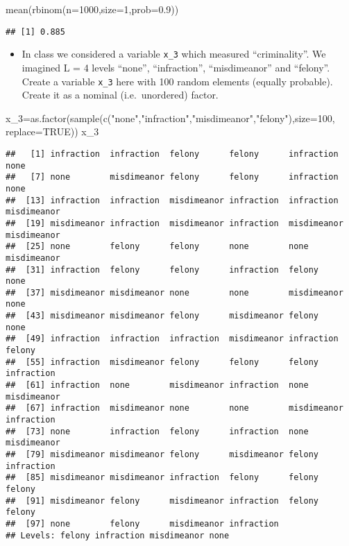 \documentclass[
]{article}
\newenvironment{Shaded}{\begin{snugshade}}{\end{snugshade}}
\newcommand{\AttributeTok}[1]{\textcolor[rgb]{0.77,0.63,0.00}{#1}}
\newcommand{\ConstantTok}[1]{\textcolor[rgb]{0.00,0.00,0.00}{#1}}
\newcommand{\DecValTok}[1]{\textcolor[rgb]{0.00,0.00,0.81}{#1}}
\newcommand{\FloatTok}[1]{\textcolor[rgb]{0.00,0.00,0.81}{#1}}
\newcommand{\FunctionTok}[1]{\textcolor[rgb]{0.00,0.00,0.00}{#1}}
\newcommand{\NormalTok}[1]{#1}
\newcommand{\OtherTok}[1]{\textcolor[rgb]{0.56,0.35,0.01}{#1}}
\newcommand{\StringTok}[1]{\textcolor[rgb]{0.31,0.60,0.02}{#1}}
\providecommand{\tightlist}{%
  \setlength{\itemsep}{0pt}\setlength{\parskip}{0pt}}
\begin{document}
\begin{Shaded}
\begin{Highlighting}[]
\FunctionTok{mean}\NormalTok{(}\FunctionTok{rbinom}\NormalTok{(}\AttributeTok{n=}\DecValTok{1000}\NormalTok{,}\AttributeTok{size=}\DecValTok{1}\NormalTok{,}\AttributeTok{prob=}\FloatTok{0.9}\NormalTok{))}
\end{Highlighting}
\end{Shaded}

\begin{verbatim}
## [1] 0.885
\end{verbatim}

\begin{itemize}
\tightlist
\item
  In class we considered a variable \texttt{x\_3} which measured
  ``criminality''. We imagined L = 4 levels ``none'', ``infraction'',
  ``misdimeanor'' and ``felony''. Create a variable \texttt{x\_3} here
  with 100 random elements (equally probable). Create it as a nominal
  (i.e.~unordered) factor.
\end{itemize}

\begin{Shaded}
\begin{Highlighting}[]
\NormalTok{x\_3}\OtherTok{=}\FunctionTok{as.factor}\NormalTok{(}\FunctionTok{sample}\NormalTok{(}\FunctionTok{c}\NormalTok{(}\StringTok{"none"}\NormalTok{,}\StringTok{"infraction"}\NormalTok{,}\StringTok{"misdimeanor"}\NormalTok{,}\StringTok{"felony"}\NormalTok{),}\AttributeTok{size=}\DecValTok{100}\NormalTok{, }\AttributeTok{replace=}\ConstantTok{TRUE}\NormalTok{))}
\NormalTok{x\_3}
\end{Highlighting}
\end{Shaded}

\begin{verbatim}
##   [1] infraction  infraction  felony      felony      infraction  none       
##   [7] none        misdimeanor felony      felony      infraction  none       
##  [13] infraction  infraction  misdimeanor infraction  infraction  misdimeanor
##  [19] misdimeanor infraction  misdimeanor infraction  misdimeanor misdimeanor
##  [25] none        felony      felony      none        none        misdimeanor
##  [31] infraction  felony      felony      infraction  felony      none       
##  [37] misdimeanor misdimeanor none        none        misdimeanor none       
##  [43] misdimeanor misdimeanor felony      misdimeanor felony      none       
##  [49] infraction  infraction  infraction  misdimeanor infraction  felony     
##  [55] infraction  misdimeanor felony      felony      felony      infraction 
##  [61] infraction  none        misdimeanor infraction  none        misdimeanor
##  [67] infraction  misdimeanor none        none        misdimeanor infraction 
##  [73] none        infraction  felony      infraction  none        misdimeanor
##  [79] misdimeanor misdimeanor felony      misdimeanor felony      infraction 
##  [85] misdimeanor misdimeanor infraction  felony      felony      felony     
##  [91] misdimeanor felony      misdimeanor infraction  felony      felony     
##  [97] none        felony      misdimeanor infraction 
## Levels: felony infraction misdimeanor none
\end{verbatim}
\end{document}
